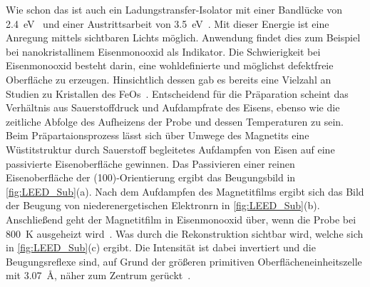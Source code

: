             Wie schon das  ist auch  ein Ladungstransfer-Isolator mit einer Bandlücke von \SI{2.4}{\electronvolt}~\cite{FeO_21} und einer Austrittsarbeit von \SI{3.5}{\electronvolt}~\cite{FeO_28}.
            Mit dieser Energie ist eine Anregung mittels sichtbaren Lichts möglich.
            Anwendung findet dies zum Beispiel bei nanokristallinem Eisenmonooxid als Indikator.
            Die Schwierigkeit bei Eisenmonooxid besteht darin, eine wohldefinierte und möglichst defektfreie Oberfläche zu erzeugen.
            Hinsichtlich dessen gab es bereits eine Vielzahl an Studien zu Kristallen des FeOs~\cite{FeO_7, FeO_19, FeO_26, FeO_23, FeO_27}.
            Entscheidend für die Präparation scheint das Verhältnis aus Sauerstoffdruck und Aufdampfrate des Eisens, ebenso wie die zeitliche Abfolge des Aufheizens der Probe und dessen Temperaturen zu sein.
            Beim Präpartaionsprozess lässt sich über Umwege des Magnetits eine Wüstitstruktur durch Sauerstoff begleitetes Aufdampfen von Eisen auf eine passivierte Eisenoberfläche gewinnen.
            Das Passivieren einer reinen Eisenoberfläche der (100)-Orientierung ergibt das Beugungsbild in \autoref{fig:LEED_Sub}(a).
            Nach dem Aufdampfen des Magnetitfilms ergibt sich das Bild der Beugung von niederenergetischen Elektronrn in \autoref{fig:LEED_Sub}(b).
            Anschließend geht der Magnetitfilm in Eisenmonooxid über, wenn die Probe bei \SI{800}{\kelvin} ausgeheizt wird~\cite{FeO_1}.
            Was durch die Rekonstruktion sichtbar wird, welche sich in \autoref{fig:LEED_Sub}(c) ergibt.
            Die Intensität ist dabei invertiert und die Beugungsreflexe sind, auf Grund der größeren primitiven Oberflächeneinheitszelle mit \SI{3.07}{\angstrom}, näher zum Zentrum gerückt~\cite{FeO_1}.

